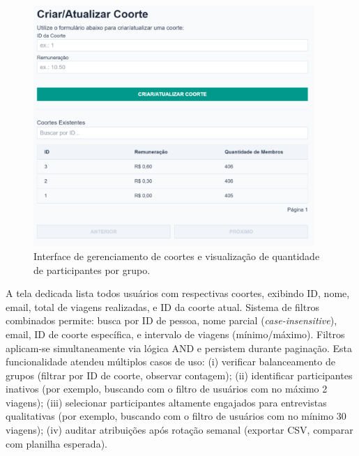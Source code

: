  \begin{figure}[H]
   \centering
   \includegraphics[width=0.95\textwidth]{figuras/coortes.PNG}
   \caption{Interface de gerenciamento de coortes e visualização de quantidade de participantes por grupo.}
   \label{fig:coortes_listagem}
 \end{figure}

 A tela dedicada lista todos usuários com respectivas coortes, exibindo ID, nome, email, total de viagens realizadas, e ID da coorte atual. Sistema de filtros combinados permite: busca por ID de pessoa, nome parcial (\textit{case-insensitive}), email, ID de coorte específica, e intervalo de viagens (mínimo/máximo). Filtros aplicam-se simultaneamente via lógica AND e persistem durante paginação. Esta funcionalidade atendeu múltiplos casos de uso: (i) verificar balanceamento de grupos (filtrar por ID de coorte, observar contagem); (ii) identificar participantes inativos (por exemplo, buscando com o filtro de usuários com no máximo 2 viagens); (iii) selecionar participantes altamente engajados para entrevistas qualitativas (por exemplo, buscando com o filtro de usuários com no mínimo 30 viagens); (iv) auditar atribuições após rotação semanal (exportar CSV, comparar com planilha esperada).


